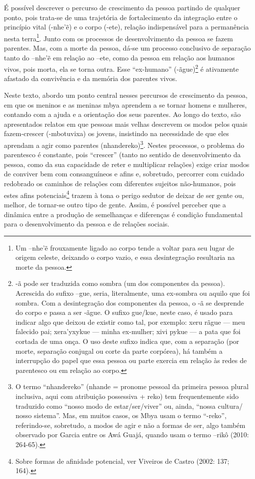 É possível descrever o percurso de crescimento da pessoa partindo de
qualquer ponto, pois trata-se de uma trajetória de fortalecimento da
integração entre o princípio vital (-nhe’\~{e}) e o corpo (-ete),
relação indispensável para a permanência nesta terra\footnote{Um
–nhe’\~{e} frouxamente ligado ao corpo tende a voltar para seu lugar
de origem celeste, deixando o corpo vazio, e essa desintegração
resultaria na morte da pessoa.}. Junto com os processos de
desenvolvimento da pessoa se fazem parentes. Mas, com a morte da
pessoa, dá-se um processo conclusivo de separação tanto do –nhe’\~{e}
em relação ao –ete, como da pessoa em relação aos humanos vivos, pois
morta, ela se torna outra. Esse ``ex-humano'' (-ãgue)\footnote{-ã pode
ser traduzida como sombra (um dos componentes da pessoa). Acrescida do
sufixo –gue, seria, literalmente, uma ex-sombra ou aquilo que foi
sombra. Com a desintegração dos componentes da pessoa, o -ã se
desprende do corpo e passa a ser -ãgue. O sufixo gue/kue, neste caso, é
usado para indicar algo que deixou de existir como tal, por exemplo:
xeru rãgue — meu falecido pai; xera’yxykue — minha ex-mulher; xivi
pykue — a pata que foi cortada de uma onça. O uso deste sufixo indica
que, com a separação (por morte, separação conjugal ou corte da parte
corpórea), há também a interrupção do papel que essa pessoa ou parte
exercia em relação às redes de parentesco ou em relação ao corpo.} é
ativamente afastado da convivência e da memória dos parentes vivos. 

Neste texto, abordo um ponto central nesses percursos de crescimento da
pessoa, em que os meninos e as meninas mbya aprendem a se tornar homens
e mulheres, contando com a ajuda e a orientação dos seus parentes. Ao
longo do texto, são apresentados relatos em que pessoas mais velhas
descrevem os modos pelos quais fazem-crescer (-mbotuvixa) os jovens,
insistindo na necessidade de que eles aprendam a agir como parentes
(nhandereko)\footnote{O termo ``nhandereko'' (nhande = pronome pessoal da
primeira pessoa plural inclusiva, aqui com atribuição possessiva +
reko) tem frequentemente sido traduzido como ``nosso modo de
estar/ser/viver'' ou, ainda, ``nossa cultura/ nosso sistema''. Mas, em
muitos casos, os Mbya usam o termo ``-reko'', referindo-se, sobretudo, a
modos de agir e não a formas de ser, algo também observado por Garcia
entre os Awá Guajá, quando usam o termo –rikô (2010: 264-65).}. Nestes
processos, o problema do parentesco é constante, pois ``crescer'' (tanto
no sentido de desenvolvimento da pessoa, como da sua capacidade de
reter e multiplicar relações) exige criar modos de conviver bem com
consanguíneos e afins e, sobretudo, percorrer com cuidado redobrado os
caminhos de relações com diferentes sujeitos não-humanos, pois estes
afins potenciais\footnote{Sobre formas de afinidade potencial, ver
Viveiros de Castro (2002: 137; 164).} trazem à tona o perigo sedutor de
deixar de ser gente ou, melhor, de tornar-se outro tipo de gente.
Assim, é possível perceber que a dinâmica entre a produção de
semelhanças e diferenças é condição fundamental para o desenvolvimento
da pessoa e de relações sociais.  

